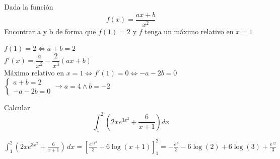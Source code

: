 \documentclass[addpoints,spanish, 12pt,a4paper]{exam}
\begin{document}
\begin{questions}

    
    

\question[2]  Dada la función $$f(x) = \dfrac{ax+b}{x^2}$$ Encontrar a y b de forma que $f(1)=2$ y $f$ tenga un máximo relativo en $x=1$

\begin{solution}
    $f(1)=2 \Longleftrightarrow a + b = 2$  \\
    $f'(x)=\dfrac{a}{x^{2}} - \dfrac{2}{x^{3}} \left(a x + b\right)$ \\
    Máximo relativo en $x=1 \Longleftrightarrow f'(1)=0 \Longleftrightarrow - a - 2 b = 0$ \\
    $\begin{cases}
    a + b = 2   \\
    - a - 2 b = 0
    \end{cases} \to a = 4 \land b=-2$
    
    
\end{solution}

\question[2] Calcular $$\int_1^2 \left( 2xe^{3x^2}+\dfrac{6}{x+1}\right) dx$$
\begin{solution}
    $\int_{1}^{2} \left(2 x e^{3 x^{2}} + \frac{6}{x + 1}\right)\, dx=\left[\frac{e^{3 x^{2}}}{3} + 6 \log{\left (x + 1 \right )}\right]_1^2=
    - \frac{e^{3}}{3} - 6 \log{\left (2 \right )} + 6 \log{\left (3 \right )} + \frac{e^{12}}{3}$
\end{solution}





\addpoints
\end{questions}
\end{document}
